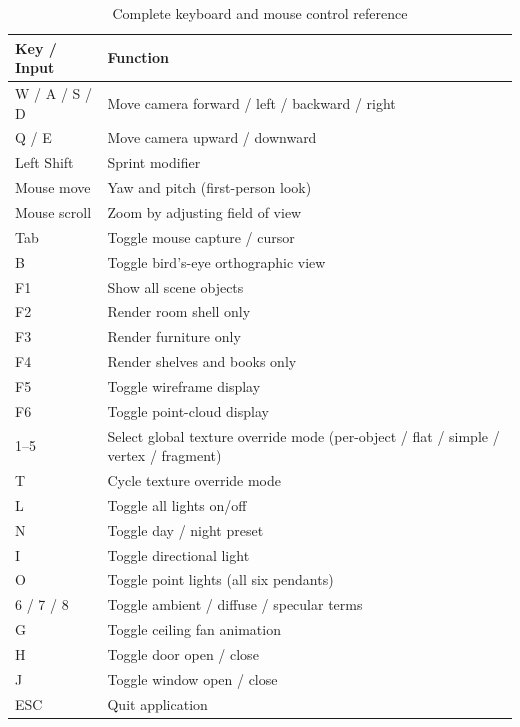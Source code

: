 \documentclass[12pt, a4paper]{article}
\begin{document}
\begin{table}[H]
    \centering
    \caption{Complete keyboard and mouse control reference}
    \begin{tabular}{ll}
        \toprule
        \textbf{Key / Input} & \textbf{Function} \\
        \midrule
        W / A / S / D & Move camera forward / left / backward / right \\
        Q / E & Move camera upward / downward \\
        Left Shift & Sprint modifier \\
        Mouse move & Yaw and pitch (first-person look) \\
        Mouse scroll & Zoom by adjusting field of view \\
        Tab & Toggle mouse capture / cursor \\
        \midrule
        B & Toggle bird's-eye orthographic view \\
        F1 & Show all scene objects \\
        F2 & Render room shell only \\
        F3 & Render furniture only \\
        F4 & Render shelves and books only \\
        F5 & Toggle wireframe display \\
        F6 & Toggle point-cloud display \\
        \midrule
        1--5 & Select global texture override mode (per-object / flat / simple / vertex / fragment) \\
        T & Cycle texture override mode \\
        \midrule
        L & Toggle all lights on/off \\
        N & Toggle day / night preset \\
        I & Toggle directional light \\
        O & Toggle point lights (all six pendants) \\
        6 / 7 / 8 & Toggle ambient / diffuse / specular terms \\
        \midrule
        G & Toggle ceiling fan animation \\
        H & Toggle door open / close \\
        J & Toggle window open / close \\
        ESC & Quit application \\
        \bottomrule
    \end{tabular}
    \label{tab:controls}
\end{table}
\end{document}
